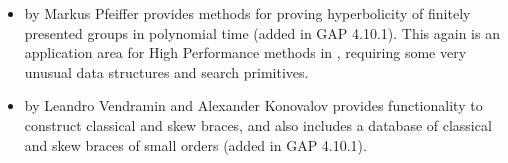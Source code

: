 \begin{itemize}
\item
{} by Markus Pfeiffer \cite{walrus} provides methods for proving 
hyperbolicity of finitely presented groups in polynomial time
(added in GAP 4.10.1). This again is an application area for High
Performance methods in \GAP, requiring some very unusual data
structures and search primitives.

\item
{} by Leandro Vendramin and Alexander Konovalov \cite{YangBaxter}
provides functionality to construct classical and 
skew braces, and also includes a database of classical 
and skew braces of small orders (added in GAP 4.10.1).

\end{itemize}
